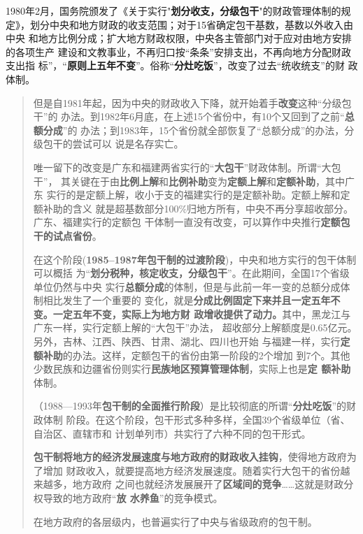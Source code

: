 1980年2月，国务院颁发了《关于实行"\textbf{划分收支，分级包干}"的财政管理体制的规
定》，划分中央和地方财政的收支范围；对于15省确定包干基数，基数以外收入由中央
和地方比例分成；扩大地方财政权限，中央各主管部门对于应对由地方安排的各项生产
建设和文教事业，不再归口按“条条”安排支出，不再向地方分配财政支出指
标”，“\textbf{原则上五年不变}”。俗称“\textbf{分灶吃饭}”，改变了过去“统收统支”的财
政体制。

\begin{quotation}
  但是自1981年起，因为中央的财政收入下降，就开始着手\textbf{改变}这种“分级包干”的
  办法。到1982年6月底，在上述15个省份中，有10个又回到了之前“\textbf{总额分成}”的
  办法；到1983年，15个省份就全部恢复了“总额分成”的办法，分级包干的尝试可以
  说是名存实亡。

  唯一留下的改变是广东和福建两省实行的“\textbf{大包干}”财政体制。所谓“大包干”，
  其关键在于由\textbf{比例上解}和\textbf{比例补助}变为\textbf{定额上解}和\textbf{定额补助}，其中广东
  实行的是定额上解，收小于支的福建实行的是定额补助。定额上解和定额补助的含义
  就是超基数部分100\%归地方所有，中央不再分享超收部分。广东、福建实行的定额包
  干体制一直没有改变，可以算作中央推行\textbf{定额包干的试点省份}。

  在这个阶段(\textbf{1985--1987年包干制的过渡阶段})，中央和地方实行的包干体制可以概括
  为“\textbf{划分税种，核定收支，分级包干}”。在此期间，全国17个省级单位仍然与中央
  实行\textbf{总额分成}的体制，但是与此前一年一变的总额分成体制相比发生了一个重要的
  变化，就是\textbf{分成比例固定下来并且一定五年不变。一定五年不变，实际上为地方财
    政增收提供了动力。}其中，黑龙江与广东一样，实行定额上解的“大包干”办法，
  超收部分上解额度是0.65亿元。另外，吉林、江西、陕西、甘肃、湖北、四川也开始
  与福建一样，实行\textbf{定额补助}的办法。这样，定额包干的省份由第一阶段的2个增加
  到7个。其他少数民族和边疆省份则实行\textbf{民族地区预算管理体制}，实际上也是\textbf{定
    额补助}体制。\cite{yangdi}

  （1988—1993年\textbf{包干制的全面推行阶段}）是比较彻底的所谓“\textbf{分灶吃饭}”的财政体制
  阶段。在这个阶段，包干形式多种多样，全国39个省级单位（省、自治区、直辖市和
  计划单列市）共实行了六种不同的包干形式。

  \textbf{包干制将地方的经济发展速度与地方政府的财政收入挂钩}，使得地方政府为了增加
  财政收入，就要提高地方经济发展速度。随着实行大包干的省份越来越多，地方政府
  之间也就经济发展展开了\textbf{区域间的竞争}……这就是财政分权导致的地方政府“\textbf{放
    水养鱼}”的竞争模式。

  在地方政府的各层级内，也普遍实行了中央与省级政府的包干制。


\end{quotation}
